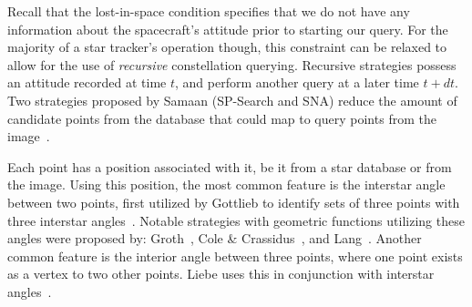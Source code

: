 %
%
%

Recall that the lost-in-space condition specifies that we do not have any information about the spacecraft's attitude prior to starting our query.
For the majority of a star tracker's operation though, this constraint can be relaxed to allow for the use of \textit{recursive} constellation querying.
Recursive strategies possess an attitude recorded at time $t$, and perform another query at a later time $t + dt$.
Two strategies proposed by Samaan (SP-Search and SNA) reduce the amount of candidate points from the database that could map to query points from the image~\cite{samaan:recursiveMode}.

Each point has a position associated with it, be it from a star database or from the image.
Using this position, the most common feature is the interstar angle between two points, first utilized by Gottlieb to identify sets of three points with three interstar angles~\cite{gottlieb:spacecraftAttitudeDetermination}.
Notable strategies with geometric functions utilizing these angles were proposed by: Groth~\cite{groth:patternMatchingMethod}, Cole \& Crassidus~\cite{coleAndCrassidis:sphericalTriangleMethod,coleAndCrassidis:planarTriangleMethod}, and Lang~\cite{lang:astrometryDotNet}.
Another common feature is the interior angle between three points, where one point exists as a vertex to two other points.
Liebe uses this in conjunction with interstar angles~\cite{liebe:starTrackersAttitudeDetermination}.


